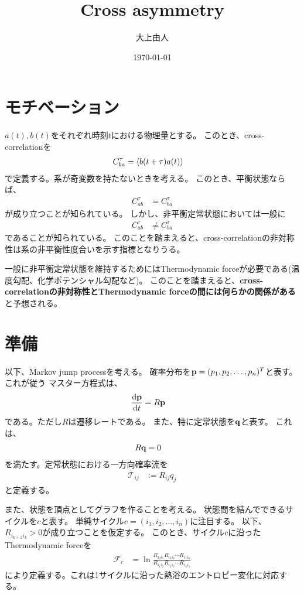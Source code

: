 \documentclass[a4paper,11pt]{jsarticle}
\numberwithin{equation}{section}
\begin{document}
\title{Cross asymmetry}
\author{大上由人}
\date{\today}
\maketitle

\section{モチベーション}
$a(t),b(t)$をそれぞれ時刻$t$における物理量とする。
このとき、cross-correlationを
\begin{align}
    C_{ba}^{\tau} &= \ev{b(t+\tau)a(t)}
\end{align}
で定義する。系が奇変数を持たないときを考える。
このとき、平衡状態ならば、
\begin{align}
    C_{ab}^{\tau} &= C_{ba}^{\tau}
\end{align}
が成り立つことが知られている。
しかし、非平衡定常状態においては一般に
\begin{align}
    C_{ab}^{\tau} &\neq C_{ba}^{\tau}
\end{align}
であることが知られている。
このことを踏まえると、cross-correlationの非対称性は系の非平衡性度合いを示す指標となりうる。

一般に非平衡定常状態を維持するためにはThermodynamic forceが必要である(温度勾配、化学ポテンシャル勾配など)。
このことを踏まえると、\textbf{cross-correlationの非対称性とThermodynamic forceの間には何らかの関係がある}と予想される。

\section{準備}
以下、Markov jump processを考える。
確率分布を$\vb{p} = (p_1, p_2, \ldots, p_n)^T$と表す。
これが従う
マスター方程式は、
\begin{align}
    \dv{\vb{p}}{t} &=R\vb{p}
\end{align}
である。ただし$R$は遷移レートである。
また、特に定常状態を$\vb{q}$と表す。
これは、
\begin{align}
    R\vb{q} &=0
\end{align}
を満たす。定常状態における一方向確率流を
\begin{align}
    \mathcal{T}_{ij} &:= R_{ij}q_j
\end{align}
と定義する。


また、状態を頂点としてグラフを作ることを考える。
状態間を結んでできるサイクルを$c$と表す。
単純サイクル$c= (i_1,i_2,\ldots,i_n)$に注目する。
以下、$R_{i_{k+1}i_k} >0$が成り立つことを仮定する。
このとき、サイクル$c$に沿ったThermodynamic forceを
\begin{align}
    \mathcal{F}_c   &= \ln \frac{R_{i_2 i_1} R_{i_3 i_2} \cdots R_{i_1 i_n}}{R_{i_1 i_2} R_{i_2 i_3} \cdots R_{i_n i_1}}
\end{align}
により定義する。これは1サイクルに沿った熱浴のエントロピー変化に対応する。\\
\end{document}

